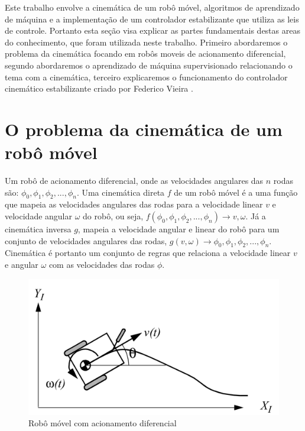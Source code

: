 
\label{Cap:Teoria}
Este trabalho envolve a cinemática de um robô móvel,
algoritmos de aprendizado de máquina e
a implementação de um controlador estabilizante
que utiliza as leis de controle. Portanto esta seção
visa explicar as partes fundamentais destas areas do conhecimento,
que foram utilizada neste trabalho. Primeiro abordaremos o problema
da cinemática focando em robôs moveis de acionamento diferencial,
segundo abordaremos o aprendizado de máquina supervisionado
relacionando o tema com a cinemática, terceiro explicaremos o
funcionamento do controlador cinemático estabilizante criado
por Federico Vieira \cite{vieira2006controle}.

\section{O problema da cinemática de um robô móvel}
Um robô de acionamento diferencial, onde as velocidades
angulares das $n$ rodas são: $\phi_0,\phi_1,\phi_2,...,\phi_n$.
Uma cinemática direta $f$ de um robô móvel é a uma função que mapeia as
velocidades
angulares das rodas para a velocidade linear $v$ e velocidade angular $\omega$
do robô, ou seja, $f(\phi_0,\phi_1,\phi_2,...,\phi_n) \rightarrow v,\omega$. Já
a cinemática inversa $g$, mapeia a velocidade angular e linear do robô para
um
conjunto de velocidades angulares das rodas,
$g(v,\omega) \rightarrow  \phi_0,\phi_1,\phi_2,...,\phi_n$.
Cinemática é portanto um conjunto de regras que relaciona a velocidade
linear $v$ e angular $\omega$
com as velocidades das rodas $\phi$.

\begin{figure}[H]
    \label{fig:robo:movel:acionamento:diferencial}
    \centering
    \includegraphics[scale=0.9]{figuras/robo.png}%
    \caption{Robô móvel com acionamento diferencial}
\end{figure}

